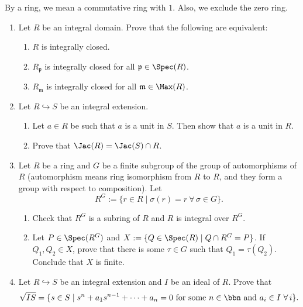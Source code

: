 \begin{convention}
By a ring, we mean a commutative ring with $1$. Also, we exclude the zero ring.
\end{convention}

\begin{enumerate}[label=\arabic*.]

\item Let $R$ be an integral domain. Prove that the following are equivalent:
\begin{enumerate}[label=(\alph*)]
    \item $R$ is integrally closed.
    \item $R_{\mathfrak p}$ is integrally closed for all $\mathfrak p \in \Spec(R)$.
    \item $R_{\mathfrak m}$ is integrally closed for all $\mathfrak m \in \Max(R)$.
\end{enumerate}

\item Let $R \hookrightarrow S$ be an integral extension.
\begin{enumerate}[label=(\alph*)]
    \item Let $a \in R$ be such that $a$ is a unit in $S$. Then show that $a$ is a unit in $R$.
    \item Prove that $\Jac(R) = \Jac(S) \cap R$.
\end{enumerate}

\item Let $R$ be a ring and $G$ be a finite subgroup of the group of automorphisms of $R$ (automorphism means ring isomorphism from $R$ to $R$, and they form a group with respect to composition). Let
\[
R^G := \{ r \in R \mid \sigma(r) = r\ \forall\, \sigma \in G \}.
\]
\begin{enumerate}[label=(\alph*)]
    \item Check that $R^G$ is a subring of $R$ and $R$ is integral over $R^G$.
    \item Let $P \in \Spec(R^G)$ and $X := \{Q \in \Spec(R) \mid Q \cap R^G = P\}$. If $Q_1,Q_2 \in X$, prove that there is some $\tau \in G$ such that $Q_1 = \tau(Q_2)$. Conclude that $X$ is finite.
\end{enumerate}

\item Let $R \hookrightarrow S$ be an integral extension and $I$ be an ideal of $R$. Prove that
\[
\sqrt{IS} = \{ s \in S \mid s^n + a_1s^{n-1} + \cdots + a_n = 0 \text{ for some } n \in \bbn \text{ and } a_i \in I\ \forall\, i \}.
\]


\end{enumerate}

